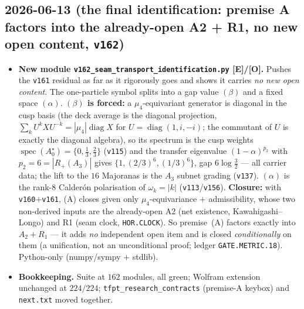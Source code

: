\documentclass[11pt]{article}
\providecommand{\mE}{\textbf{[E]}}\providecommand{\mC}{\textbf{[C]}}
\providecommand{\mO}{\textbf{[O]}}\providecommand{\mX}{\textbf{[X]}}
\providecommand{\vref}[1]{\texttt{#1}}
\begin{document}
\subsection*{2026-06-13 (the final identification: premise A factors into the already-open A2 + R1, no new open content, \vref{v162})}
\begin{itemize}
\item \textbf{New module \texttt{v162\_seam\_transport\_identification.py} \mE/\mO.} Pushes the \vref{v161}
  residual as far as it rigorously goes and shows it carries \emph{no new open content}. The one-particle
  symbol splits into a gap value $(\beta)$ and a fixed space $(\alpha)$. \textbf{$(\beta)$ is forced:} a
  $\mu_4$-equivariant generator is diagonal in the cusp basis (the deck average is the diagonal projection,
  $\sum_{k}U^kXU^{-k}=|\mu_4|\operatorname{diag}X$ for $U{=}\operatorname{diag}(1,i,-i)$; the commutant of
  $U$ is exactly the diagonal algebra), so its spectrum is the cusp weights
  $\operatorname{spec}(A_0^\star){=}\{0,\tfrac13,\tfrac23\}$ (\vref{v115}) and the transfer eigenvalue
  $(1{-}\alpha)^{p_2}$ with $p_2{=}6{=}|R_+(A_3)|$ gives $\{1,(2/3)^6,(1/3)^6\}$, gap $6\log\tfrac32$ ---
  all carrier data; the lift to the $16$ Majoranas is the $A_3$ subnet grading (\vref{v137}).
  \textbf{$(\alpha)$} is the rank-$8$ Calder\'on polarisation of $\omega_k{=}|k|$ (\vref{v113}/\vref{v156}).
  \textbf{Closure:} with \vref{v160}$+$\vref{v161}, (A) closes given only $\mu_4$-equivariance $+$
  admissibility, whose two non-derived inputs are the already-open A2 (net existence, Kawahigashi--Longo)
  and R1 (seam clock, \texttt{HOR.CLOCK}). So premise~(A) factors exactly into $A_2+R_1$ --- it adds
  \emph{no} independent open item and is closed \emph{conditionally} on them (a unification, not an
  unconditional proof; ledger \texttt{GATE.METRIC.18}). Python-only (numpy/sympy $+$ stdlib).
\item \textbf{Bookkeeping.} Suite at $162$ modules, all green; Wolfram extension unchanged at $224/224$;
  \texttt{tfpt\_research\_contracts} (premise-A keybox) and \texttt{next.txt} moved together.
\end{itemize}
\end{document}

